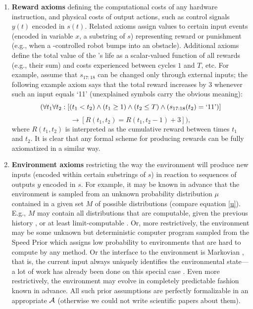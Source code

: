 \begin{enumerate}
\begin{enumerate}
\item
{\bf Reward axioms}
defining the computational costs of any
hardware instruction, 
and physical costs of output 
actions, such as control signals $y(t)$
encoded in $s(t)$.
Related axioms assign values to certain input events 
(encoded in variable $x$, a substring of $s$)
representing reward or punishment (e.g.,
when a \gmn-controlled robot bumps into an obstacle).
Additional axioms define the total value of the \gmn 's life as a 
scalar-valued function of all 
rewards (e.g., their sum) and 
costs experienced between cycles $1$ and $T$, etc.
For example, assume that
$s_{17:18}$ can be changed only through
external inputs; the following example axiom 
says that the total reward increases by 3 whenever
such an input equals `11'
(unexplained symbols carry the obvious meaning):
\[
(\forall t_1 \forall t_2:
[(t_1 < t_2) \wedge  (t_1 \geq 1) 
\wedge  (t_2 \leq T)  
\wedge  (s_{17:18}(t_2)=`11\textrm{'})  ]
\]
\[
\rightarrow
[R(t_1,t_2)= R(t_1,t_2-1)+3]),
\]
where $R(t_1,t_2)$ is interpreted as 
the cumulative reward between times $t_1$ and $t_2$.
It is clear that any formal scheme for producing
rewards can be fully axiomatized in a similar way.

\item
\label{envaxioms}
{\bf Environment axioms}
restricting the way the environment will produce 
new inputs (encoded within certain substrings of $s$) in reaction to 
sequences of outputs $y$ encoded in $s$.
For example, it may be known
in advance that the environment is sampled from an unknown probability
distribution $\mu$ contained in a given set $M$
of possible distributions (compare equation \ref{u}).
E.g., $M$ may contain all distributions
that are computable, given the previous history
\cite{Solomonoff:64,Solomonoff:78,Hutter:01aixi+},
or at least limit-computable \cite{Schmidhuber:00v2,Schmidhuber:02ijfcs}.
Or, more restrictively, the environment
may be some unknown but deterministic computer
program \cite{Zuse:69,Schmidhuber:97brauer}
sampled from the Speed Prior \cite{Schmidhuber:02colt} which assigns
low probability to environments that are hard to compute by any method.
Or the interface to the environment is Markovian \cite{Schmidhuber:91nips},
that is, the current
input always uniquely identifies the environmental state---a lot
of work has already been done 
on this special case \cite{Samuel:59,Bellman:61,Sutton:98}.
Even more restrictively, the environment may evolve in completely
predictable fashion known in advance.
All such prior assumptions
are perfectly formalizable in an appropriate $\cal A$ 
(otherwise we could not write scientific papers about them).


\end{enumerate}
\end{enumerate}
